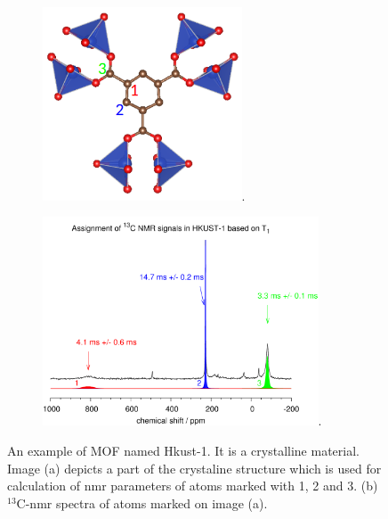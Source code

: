 \documentclass[openany, longbibliography,slovene,a4paper,12pt]{article}
\begin{document}
 \begin{figure}
   \centering
      \begin{subfigure}[b]{0.5\textwidth}
  \centering
  \includegraphics[width=0.65\textwidth]{hkust_molekula_placeholder.png}.
  \caption{}
\end{subfigure}%
   \begin{subfigure}[b]{0.5\textwidth}
  \centering
  \includegraphics[width=0.9\textwidth]{hkust_spekter.png}.
  \caption{}
\end{subfigure}
  \caption{ An example of MOF named Hkust-1. It is a crystalline
    material. Image (a) depicts a part of the crystaline structure which is used for calculation of
    nmr parameters of atoms marked with 1, 2 and 3. (b) $^{13}\mathrm{C}$-nmr
    spectra of atoms marked on image (a).
  }
  \end{figure}
\end{document}
